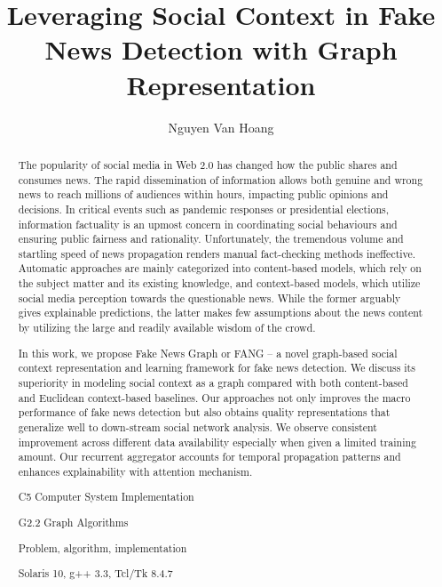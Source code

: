 \documentclass[fyp]{socreport}
\theoremstyle{definition}
\theoremstyle{hypothesis}
\begin{document}
\title{Leveraging Social Context in Fake News Detection with Graph Representation}
\author{Nguyen Van Hoang}
\maketitle
\begin{abstract}
The popularity of social media in Web 2.0 has changed how the public shares and consumes news. The rapid dissemination of information allows both genuine and wrong news to reach millions of audiences within hours, impacting public opinions and decisions. In critical events such as pandemic responses or presidential elections, information factuality is an upmost concern in coordinating social behaviours and ensuring public fairness and rationality. Unfortunately, the tremendous volume and startling speed of news propagation renders manual fact-checking methods ineffective. Automatic approaches are mainly categorized into content-based models, which rely on the subject matter and its existing knowledge, and context-based models, which utilize social media perception towards the questionable news. While the former arguably gives explainable predictions, the latter makes few assumptions about the news content by utilizing the large and readily available wisdom of the crowd.

In this work, we propose Fake News Graph or FANG -- a novel graph-based social context representation and learning framework for fake news detection. We discuss its superiority in modeling social context as a graph compared with both content-based and Euclidean context-based baselines. Our approaches not only improves the macro performance of fake news detection but also obtains quality representations that generalize well to down-stream social network analysis. We observe consistent improvement across different data availability especially when given a limited training amount. Our recurrent aggregator accounts for temporal propagation patterns and enhances explainability with attention mechanism.

\begin{descriptors}
    \item C5 Computer System Implementation
	\item G2.2 Graph Algorithms
\end{descriptors}
\begin{keywords}
	Problem, algorithm, implementation
\end{keywords}
\begin{implement}
	Solaris 10, g++ 3.3, Tcl/Tk 8.4.7
\end{implement}

\end{abstract}
\end{document}
